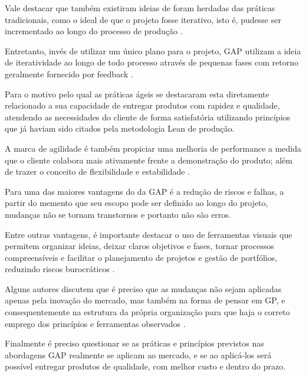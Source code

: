 Vale destacar que também existiram ideias de foram herdadas das práticas tradicionais, como o ideal de que o projeto fosse iterativo, isto é, pudesse ser incrementado ao longo do processo de produção \cite{aguanno2004101, boehm1988spiral}.

Entretanto, invés de utilizar um único plano para o projeto, GAP utilizam a ideia de iteratividade ao longo de todo processo através de pequenas fases com retorno geralmente fornecido por feedback \cite{augustine2005managing, boehm2004balancing, cohn2005agile, highsmith2009agile, schwaber2004agile}.

Para  o motivo pelo qual as práticas ágeis se destacaram esta diretamente relacionado a sua capacidade de entregar produtos com rapidez e qualidade, atendendo as necessidades do cliente de forma satisfatória utilizando princípios que já haviam sido citados pela metodologia Lean de produção.

 A marca de agilidade é também propiciar uma melhoria de performance a medida que o cliente colabora mais ativamente frente a demonstração do produto; além de trazer o conceito de flexibilidade e estabilidade \cite{chin2004agile}.

Para  uma das maiores vantagens do da GAP é a redução de riscos e falhas, a partir do memento que seu escopo pode ser definido ao longo do projeto, mudanças não se tornam transtornos e portanto não são erros.

Entre outras vantagens, é importante destacar o uso de ferramentas visuais que permitem organizar ideias, deixar claros objetivos e fases, tornar processos compreensíveis e facilitar o planejamento de projetos e gestão de portfólios, reduzindo riscos burocráticos \cite{malachiasproject}.

Alguns autores discutem que é preciso que as mudanças não sejam aplicadas apenas pela inovação do mercado, mas também na forma de pensar em GP, e consequentemente na estrutura da própria organização para que haja o correto emprego dos princípios e ferramentas observados \cite{aguanno2004101, boehm2003using, chin2004agile, cockburn2006agile, decarlo2010extreme, highsmith2009agile, leffingwell2007scaling, shenhar2007reinventing}.

Finalmente é preciso questionar se as práticas e princípios previstos nas abordagens GAP realmente se aplicam ao mercado, e se ao aplicá-los será possível entregar produtos de qualidade, com melhor custo e dentro do prazo.

